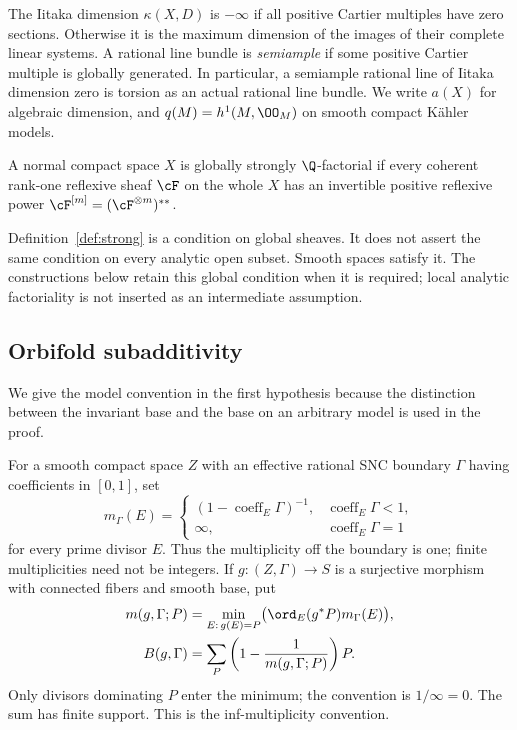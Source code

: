 The Iitaka dimension \(\kappa(X,D)\) is \(-\infty\) if all positive
Cartier multiples have zero sections. Otherwise it is the maximum
dimension of the images of their complete linear systems. A rational
line bundle is \emph{semiample} if some positive Cartier multiple is
globally generated. In particular, a semiample rational line of Iitaka
dimension zero is torsion as an actual rational line bundle.
We write \(a(X)\) for algebraic dimension, and
\(q(M)=h^1(M,\OO_M)\) on smooth compact K\"ahler models.

\begin{definition}
\label{def:strong}
A normal compact space \(X\) is globally strongly
\(\Q\)-factorial if every coherent rank-one reflexive sheaf
\(\cF\) on the whole \(X\) has an invertible positive reflexive
power \(\cF^{[m]}=(\cF^{\otimes m})^{**}\).
\end{definition}

Definition~\ref{def:strong} is a condition on global sheaves. It does
not assert the same condition on every analytic open subset. Smooth
spaces satisfy it. The constructions below retain this global
condition when it is required; local analytic factoriality is not
inserted as an intermediate assumption.

\subsection{Orbifold subadditivity}

We give the model convention in the first hypothesis because the
distinction between the invariant base and the base on an arbitrary
model is used in the proof.

For a smooth compact space \(Z\) with an effective rational SNC
boundary \(\Gamma\) having coefficients in \([0,1]\), set
\[
 m_\Gamma(E)=
 \begin{cases}
 (1-\operatorname{coeff}_E\Gamma)^{-1},&
                  \operatorname{coeff}_E\Gamma<1,\\
 \infty,&\operatorname{coeff}_E\Gamma=1
 \end{cases}
\]
for every prime divisor \(E\). Thus the multiplicity off the boundary
is one; finite multiplicities need not be integers. If
\(g:(Z,\Gamma)\to S\) is a surjective morphism with connected
fibers and smooth base, put
\begin{equation}\label{eq:orbifold-base}
 \begin{split}
 m(g,\Gamma;P)&=
   \min_{E:\,g(E)=P}\bigl(\ord_E(g^*P)m_\Gamma(E)\bigr),\\
 B(g,\Gamma)&=\sum_P\left(1-\frac1{m(g,\Gamma;P)}\right)P.
 \end{split}
\end{equation}
Only divisors dominating \(P\) enter the minimum; the convention is
\(1/\infty=0\). The sum has finite support. This is the
inf-multiplicity convention.

